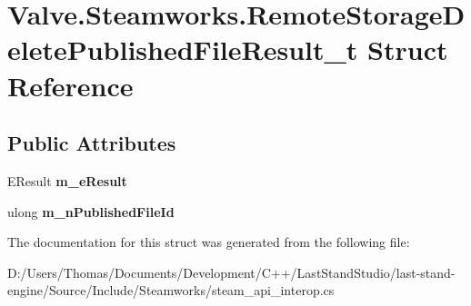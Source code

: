 \hypertarget{structValve_1_1Steamworks_1_1RemoteStorageDeletePublishedFileResult__t}{}\section{Valve.\+Steamworks.\+Remote\+Storage\+Delete\+Published\+File\+Result\+\_\+t Struct Reference}
\label{structValve_1_1Steamworks_1_1RemoteStorageDeletePublishedFileResult__t}
\subsection*{Public Attributes}
\begin{DoxyCompactItemize}
\item 
\hypertarget{structValve_1_1Steamworks_1_1RemoteStorageDeletePublishedFileResult__t_a887b32bc0886638138592becbc001f6c}{}E\+Result {\bfseries m\+\_\+e\+Result}\label{structValve_1_1Steamworks_1_1RemoteStorageDeletePublishedFileResult__t_a887b32bc0886638138592becbc001f6c}

\item 
\hypertarget{structValve_1_1Steamworks_1_1RemoteStorageDeletePublishedFileResult__t_a5aa262550ffb7500cd80c652261bb5fd}{}ulong {\bfseries m\+\_\+n\+Published\+File\+Id}\label{structValve_1_1Steamworks_1_1RemoteStorageDeletePublishedFileResult__t_a5aa262550ffb7500cd80c652261bb5fd}

\end{DoxyCompactItemize}


The documentation for this struct was generated from the following file\+:\begin{DoxyCompactItemize}
\item 
D\+:/\+Users/\+Thomas/\+Documents/\+Development/\+C++/\+Last\+Stand\+Studio/last-\/stand-\/engine/\+Source/\+Include/\+Steamworks/steam\+\_\+api\+\_\+interop.\+cs\end{DoxyCompactItemize}
